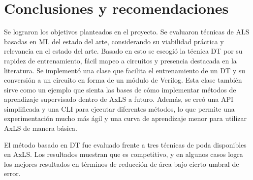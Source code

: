 \chapter{Conclusiones y recomendaciones}




Se lograron los objetivos planteados en el proyecto.
Se evaluaron técnicas de ALS basadas en ML del estado del arte, considerando su
viabilidad práctica y relevancia en el estado del arte.
Basado en esto se escogió la técnica DT por su rapidez de entrenamiento, fácil
mapeo a circuitos y presencia destacada en la literatura.
Se implementó una clase que facilita el entrenamiento de un DT y su conversión
a un circuito en forma de un módulo de Verilog. Esta clase también sirve como
un ejemplo que sienta las bases de cómo implementar métodos de aprendizaje
supervisado dentro de AxLS a futuro.
Además, se creó una API simplificada y una CLI para ejecutar diferentes
métodos, lo que permite una experimentación mucho más ágil y una curva de
aprendizaje menor para utilizar AxLS de manera básica.

El método basado en DT fue evaluado frente a tres técnicas de poda disponibles
en AxLS. Los resultados muestran que es competitivo, y en algunos casos logra
los mejores resultados en términos de reducción de área bajo cierto umbral de
error.

